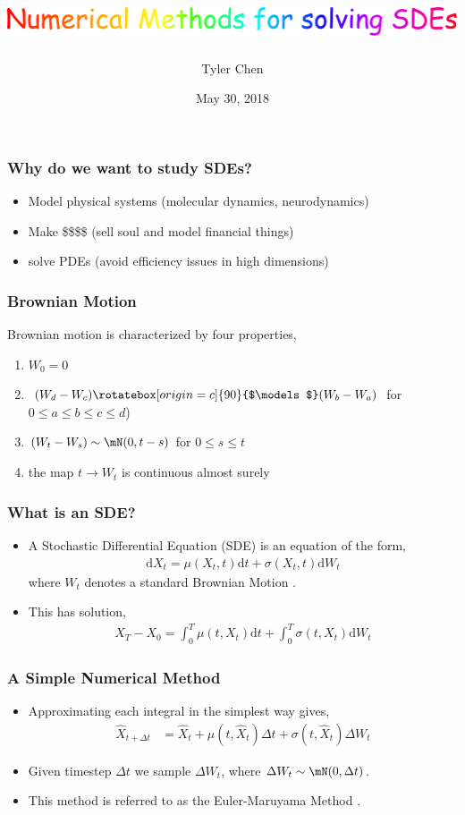 \documentclass{beamer}
\title{\centering\includegraphics[width=\textwidth]{../img/title.pdf}}
\author{Tyler Chen}
\institute{}
\date{May 30, 2018}
\newcommand{\indep}{\rotatebox[origin=c]{90}{$\models$}}
\renewcommand{\d}{\ensuremath{\mathrm{d}}}
\begin{document}
\frame{\setsansfont{Comic Sans MS}\titlepage}

\begin{frame}
\frametitle{Why do we want to study SDEs?}
\begin{itemize}
    \item Model physical systems (molecular dynamics, neurodynamics)
    \item Make \$\$\$\$ (sell soul and model financial things)
    \item solve PDEs (avoid efficiency issues in high dimensions)
\end{itemize}
\end{frame}

\begin{frame}
\frametitle{Brownian Motion}
Brownian motion is characterized by four properties,
\begin{enumerate}
    \item \( W_0 = 0 \)
    \item \( (W_d-W_c) \indep (W_b-W_a) \) for \( 0\leq a\leq b\leq c\leq d \))
    \item \( (W_t - W_s) \sim \mN(0,t-s) \) for \( 0\leq s\leq t \)
    \item the map \( t \to W_t \) is continuous almost surely
\end{enumerate}
\end{frame}

\begin{frame}
\frametitle{What is an SDE?}
\begin{itemize}
    \item A Stochastic Differential Equation (SDE) is an equation of the form,
    \begin{align*}
    \d X_t =  \mu(X_t,t)\d t + \sigma(X_t,t)\d W_t
    \end{align*}
    where \( W_t \) denotes a standard Brownian Motion \cite{lorig}.
    \item This has solution,
    \begin{align*}
    X_{T} - X_{0} = \int_{0}^{T} \mu(t,X_t)\d t + \int_{0}^{T} \sigma(t,X_t) \d W_t
    \end{align*}
\end{itemize}

\end{frame}


\begin{frame}
\frametitle{A Simple Numerical Method}

\begin{itemize}
\item Approximating each integral in the simplest way gives,
\begin{align*}
    \hat{X}_{t+\Delta t} &= \hat{X}_t + \mu(t,\hat{X}_{t}) \Delta t + \sigma(t,\hat{X}_{t}) \Delta W_{t}
\end{align*}

\item Given timestep \( \Delta t \) we sample \( \Delta W_t \), where \( \Delta W_t \sim  \mN(0,\Delta t) \).
\item This method is referred to as the Euler-Maruyama Method \cite{sdes}.
\end{itemize}

\end{frame}
\end{document}
